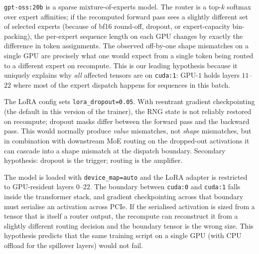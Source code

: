 \documentclass[11pt]{article}
\begin{document}
\begin{description}[leftmargin=1.4em, itemsep=2pt]
\item[\textbf{H1: MoE expert routing.}] \texttt{gpt-oss:20b} is a
  sparse mixture-of-experts model. The router is a top-$k$ softmax
  over expert affinities; if the recomputed forward pass sees a
  slightly different set of selected experts (because of bf16
  round-off, dropout, or expert-capacity bin-packing), the per-expert
  sequence length on each GPU changes by exactly the difference in
  token assignments. The observed off-by-one shape mismatches on a
  single GPU are precisely what one would expect from a single token
  being routed to a different expert on recompute. This is our
  leading hypothesis because it uniquely explains why \emph{all}
  affected tensors are on \texttt{cuda:1}: GPU-$1$ holds layers
  $11$--$22$ where most of the expert dispatch happens for sequences
  in this batch.
\item[\textbf{H2: LoRA dropout under reentrant checkpointing.}] The
  LoRA config sets \texttt{lora\_dropout=0.05}. With reentrant
  gradient checkpointing (the default in this version of the
  trainer), the RNG state is not reliably restored on recompute;
  dropout masks differ between the forward pass and the backward
  pass. This would normally produce \emph{value} mismatches, not
  \emph{shape} mismatches, but in combination with downstream MoE
  routing on the dropped-out activations it can cascade into a shape
  mismatch at the dispatch boundary. Secondary hypothesis: dropout is
  the trigger; routing is the amplifier.
\item[\textbf{H3: Multi-GPU dispatch and \texttt{device\_map=auto}.}]
  The model is loaded with \texttt{device\_map=auto} and the LoRA
  adapter is restricted to GPU-resident layers $0$--$22$. The
  boundary between \texttt{cuda:0} and \texttt{cuda:1} falls inside
  the transformer stack, and gradient checkpointing across that
  boundary must serialise an activation across PCIe. If the
  serialised activation is sized from a tensor that is itself a
  router output, the recompute can reconstruct it from a slightly
  different routing decision and the boundary tensor is the wrong
  size. This hypothesis predicts that the same training script on a
  single GPU (with CPU offload for the spillover layers) would not
  fail.
\end{description}
\end{document}
